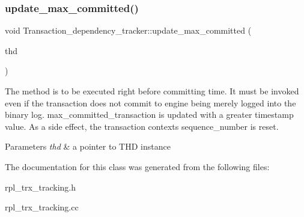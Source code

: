 \subsubsection{\texorpdfstring{update\+\_\+max\+\_\+committed()}{update\_max\_committed()}}
{\footnotesize\ttfamily void Transaction\+\_\+dependency\+\_\+tracker\+::update\+\_\+max\+\_\+committed (\begin{DoxyParamCaption}\item[{T\+HD $\ast$}]{thd }\end{DoxyParamCaption})}

The method is to be executed right before committing time. It must be invoked even if the transaction does not commit to engine being merely logged into the binary log. max\+\_\+committed\+\_\+transaction is updated with a greater timestamp value. As a side effect, the transaction context\textquotesingle{}s sequence\+\_\+number is reset.


\begin{DoxyParams}{Parameters}
{\em thd} & a pointer to T\+HD instance \\
\hline
\end{DoxyParams}


The documentation for this class was generated from the following files\+:\begin{DoxyCompactItemize}
\item 
rpl\+\_\+trx\+\_\+tracking.\+h\item 
rpl\+\_\+trx\+\_\+tracking.\+cc\end{DoxyCompactItemize}
